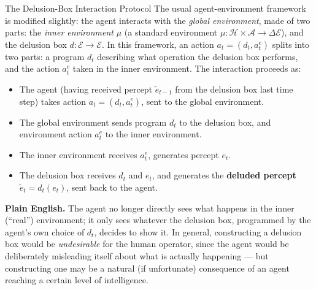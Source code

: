 \documentclass[aspectratio=169,10pt]{beamer}
\newcommand{\Ac}{\mathcal{A}}
\newcommand{\Ec}{\mathcal{E}}
\newcommand{\Hc}{\mathcal{H}}
\begin{document}
\begin{frame}{The Delusion-Box Interaction Protocol}
  The usual agent-environment framework is modified slightly: the agent
  interacts with the \emph{global environment}, made of two parts: the
  \emph{inner environment} $\mu$ (a standard environment
  $\mu:\Hc\times\Ac\to\Delta\Ec$), and the delusion box
  $d:\Ec\to\Ec$. In this framework, an action $a_t=(d_t,a^e_t)$ splits
  into two parts: a program $d_t$ describing what operation the delusion
  box performs, and the action $a^e_t$ taken in the inner environment. The
  interaction proceeds as:

  \begin{itemize}
    \item The agent (having received percept $\tilde e_{t-1}$ from the
      delusion box last time step) takes action $a_t=(d_t,a^e_t)$, sent to
      the global environment.
    \item The global environment sends program $d_t$ to the delusion box,
      and environment action $a^e_t$ to the inner environment.
    \item The inner environment receives $a^e_t$, generates percept $e_t$.
    \item The delusion box receives $d_t$ and $e_t$, and generates the
      \textbf{deluded percept} $\tilde e_t=d_t(e_t)$, sent back to the
      agent.
  \end{itemize}

  \textbf{Plain English.} The agent no longer directly sees what happens
  in the inner (``real'') environment; it only sees whatever the delusion
  box, programmed by the agent's own choice of $d_t$, decides to show it.
  In general, constructing a delusion box would be \emph{undesirable} for
  the human operator, since the agent would be deliberately misleading
  itself about what is actually happening --- but constructing one may be
  a natural (if unfortunate) consequence of an agent reaching a certain
  level of intelligence.
\end{frame}
\end{document}
